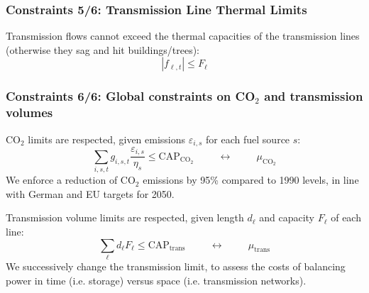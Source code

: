 \documentclass[10pt,aspectratio=169,dvipsnames]{beamer}
\def\m{\mu}
\def\co2{CO${}_2$}
\begin{document}
\begin{frame}
  \frametitle{Constraints 5/6: Transmission Line Thermal Limits}

    Transmission flows cannot exceed the thermal capacities of the transmission lines (otherwise they sag and hit buildings/trees):
    \begin{equation*}
      | f_{\ell,t} | \leq  F_\ell
    \end{equation*}

\end{frame}



\begin{frame}
  \frametitle{Constraints 6/6: Global constraints on \co2 and transmission volumes}
  CO${}_2$ limits are respected, given emissions $\varepsilon_{i,s}$ for each fuel source $s$:
    \begin{equation*}
      \sum_{i,s,t}  g_{i,s,t} \frac{\varepsilon_{i,s}}{\eta_{s}} \leq \textrm{CAP}_{\textrm{CO}_2} \hspace{1cm} \leftrightarrow \hspace{1cm} \m_{\textrm{CO}_2}
    \end{equation*}
    We enforce a reduction of \co2 emissions by 95\% compared to 1990
    levels, in line with German and EU targets for 2050.

    Transmission volume limits are respected, given length $d_\ell$ and capacity $F_\ell$ of each line:
    \begin{equation*}
      \sum_{\ell} d_\ell   F_\ell \leq \textrm{CAP}_{\textrm{trans}} \hspace{1cm} \leftrightarrow \hspace{1cm} \m_{\textrm{trans}}
    \end{equation*}
    We  successively change the transmission limit, to assess the costs of balancing power in time (i.e. storage) versus space (i.e. transmission networks).

\end{frame}
\end{document}
